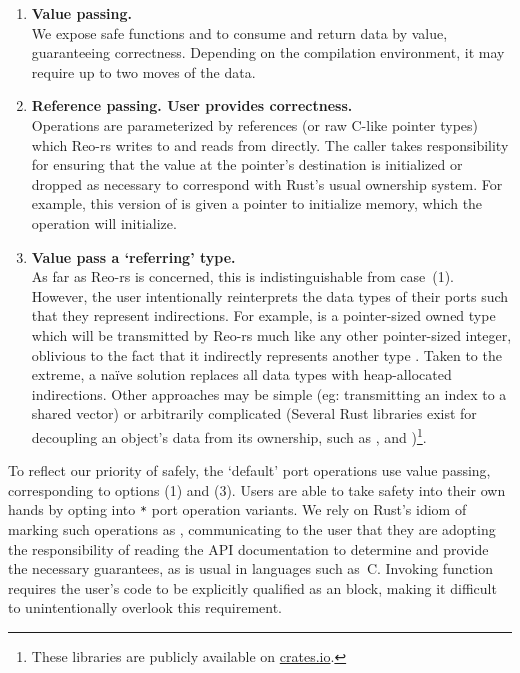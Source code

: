 \begin{enumerate}
	\item \textbf{Value passing.}\\
	We expose safe functions  and  to consume and return data by value, guaranteeing correctness. Depending on the compilation environment, it may require up to two moves of the data.
	
	\item \textbf{Reference passing. User provides correctness.}\\
	Operations are parameterized by references (or raw C-like pointer types) which Reo-rs writes to and reads from directly. The caller takes responsibility for ensuring that the value at the pointer's destination is initialized or dropped as necessary to correspond with Rust's usual ownership system. For example, this version of  is given a pointer to initialize memory, which the operation will initialize.
	
	\item \textbf{Value pass a `referring' type.}\\
	As far as Reo-rs is concerned, this is indistinguishable from case~(1). However, the user intentionally reinterprets the data types of their ports such that they represent indirections. For example,  is a pointer-sized owned type which will be transmitted by Reo-rs much like any other pointer-sized integer, oblivious to the fact that it indirectly represents another type . Taken to the extreme, a na\"ive solution replaces all data types with heap-allocated indirections. Other approaches may be simple (eg: transmitting an index to a shared vector) or arbitrarily complicated (Several Rust libraries exist for decoupling an object's data from its ownership, such as ,  and )\footnote{These libraries are publicly available on \url{crates.io}.}. 
\end{enumerate}

To reflect our priority of safely, the `default' port operations use value passing, corresponding to options (1) and (3). Users are able to take safety into their own hands by opting into \texttt{*} port operation variants. We rely on Rust's idiom of marking such operations as , communicating to the user that they are adopting the responsibility of reading the API documentation to determine and provide the necessary guarantees, as is usual in languages such as~C. Invoking  function requires the user's code to be explicitly qualified as an  block, making it difficult to unintentionally overlook this requirement. 

